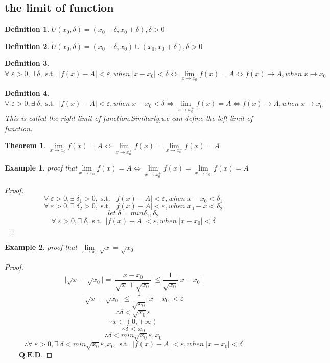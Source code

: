 \documentclass[a4paper,12pt]{report}
\newtheorem{example}{Example}[section]       %
\newtheorem{theorem}{Theorem}[section]      %
\newtheorem{definition}{Definition}[section]     %
\newtheorem*{proof}{Proof}    %
\newcommand{\st}{\operatorname{s.t.}}
\begin{document}
\subsection{the limit of function}
\begin{definition}
    $U(x_0, \delta)=(x_0-\delta,x_0+\delta),\delta>0$
\end{definition}
\begin{definition}
    $\mathring{U}(x_0, \delta)=(x_0-\delta,x_0)\cup (x_0,x_0+\delta),\delta>0$
\end{definition}
\begin{definition}
    $\forall\;\varepsilon>0,\exists\;\delta,\st\;\vert f(x)-A\vert<\varepsilon,when\;\vert x-x_0\vert<\delta\Leftrightarrow\lim\limits_{x\rightarrow x_0}f(x)=A\Leftrightarrow f(x)\rightarrow A,when\;x\rightarrow x_0$
\end{definition}
\begin{definition}
    $\forall\;\varepsilon>0,\exists\;\delta,\st\;\vert f(x)-A\vert<\varepsilon,when\;x-x_0<\delta\Leftrightarrow\lim\limits_{x\rightarrow x_0^+}f(x)=A\Leftrightarrow f(x)\rightarrow A,when\;x\rightarrow x_0^+$
This is called the right limit of function.Similarly,we can define the left limit of function.
\end{definition}
\begin{theorem}
    $\lim\limits_{x\rightarrow x_0}f(x)=A\Leftrightarrow\lim\limits_{x\rightarrow x_0^+}f(x)=\lim\limits_{x\rightarrow x_0^-}f(x)=A$
\end{theorem}
\begin{example}
    proof that$\lim\limits_{x\rightarrow x_0}f(x)=A\Leftrightarrow\lim\limits_{x\rightarrow x_0^+}f(x)=\lim\limits_{x\rightarrow x_0^-}f(x)=A$
\end{example}
\begin{proof}
    $$\forall\;\varepsilon>0,\exists\;\delta_1>0,\st\;\vert f(x)-A\vert<\varepsilon,when\; x-x_0<\delta_1$$
    $$\forall\;\varepsilon>0,\exists\;\delta_2>0,\st\;\vert f(x)-A\vert<\varepsilon,when\; x_0-x<\delta_2$$
    $$let\;\delta=min{\delta_1,\delta_2}$$
    $$\forall\;\varepsilon>0,\exists\;\delta,\st\;\vert f(x)-A\vert<\varepsilon,when\;\vert x-x_0\vert<\delta$$
\end{proof}
\begin{example}
    proof that $\lim\limits_{x\rightarrow x_0}{\sqrt{x}}=\sqrt{x_0}$
\end{example}
\begin{proof}
    $$\vert\sqrt{x}-\sqrt{x_0}\vert=\vert\displaystyle\frac{x-x_0}{\sqrt{x}+\sqrt{x_0}}\vert\leq \displaystyle\frac{1}{\sqrt{x_0}}\vert x-x_0\vert$$
    $$\vert\sqrt{x}-\sqrt{x_0}\vert\leq\displaystyle\frac{1}{\sqrt{x_0}}\vert x-x_0\vert<\varepsilon$$
    $$\therefore \delta<\sqrt{x_0}\varepsilon$$
    $$\because x\in(0,+\infty)$$
    $$\therefore \delta<x_0$$
    $$\therefore \delta<min{\sqrt{x_0}\varepsilon,x_0}$$
    $$\therefore \forall\;\varepsilon>0,\exists\;\delta<min{\sqrt{x_0}\varepsilon,x_0},\st\;\vert f(x)-A\vert<\varepsilon,when\;\vert x-x_0\vert<\delta$$
    $\qquad\mathbf{Q.E.D.}$
\end{proof}
\end{document}
